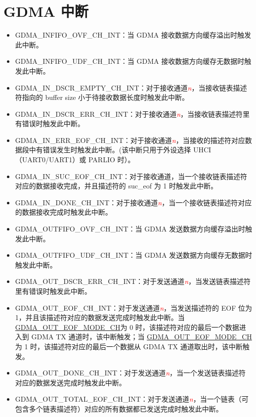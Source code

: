 \documentclass[main\_\_CN.tex]{subfiles}
\begin{document}
\section{GDMA 中断}
\begin{itemize}
\item \label{int:GDMAINFIFOOVFINT} GDMA\_INFIFO\_OVF\_CH\_INT：当 GDMA 接收数据方向缓存溢出时触发此中断。
\item \label{int:GDMAINFIFOUDFINT}GDMA\_INFIFO\_UDF\_CH\_INT：当 GDMA 接收数据方向缓存无数据时触发此中断。
\item \label{int:GDMAINDSCREMPTYINT}GDMA\_IN\_DSCR\_EMPTY\_CH\_INT：对于接收通道\textcolor{red}{\it{n}}，当接收链表描述符指向的 buffer size 小于待接收数据长度时触发此中断。
\item \label{int:GDMAINDSCRERRINT}GDMA\_IN\_DSCR\_ERR\_CH\_INT：对于接收通道\textcolor{red}{\it{n}}，当接收链表描述符里有错误时触发此中断。
\item \label{int:GDMAINERREOFINT}GDMA\_IN\_ERR\_EOF\_CH\_INT：对于接收通道\textcolor{red}{\it{n}}，当接收的描述符对应数据段中有错误发生时触发此中断。(该中断只用于外设选择 UHCI（UART0/UART1）或 PARLIO 时）。
\item \label{int:GDMAINSUCEOFINT}GDMA\_IN\_SUC\_EOF\_CH\_INT：对于接收通道，当一个接收链表描述符对应的数据接收完成，并且描述符的 suc\_eof 为 1 时触发此中断。
\item \label{int:GDMAINDONEINT}GDMA\_IN\_DONE\_CH\_INT：对于接收通道\textcolor{red}{\it{n}}，当一个接收链表描述符对应的数据接收完成时触发此中断。
\item \label{int:GDMAOUTFIFOOVFINT} GDMA\_OUTFIFO\_OVF\_CH\_INT：当 GDMA 发送数据方向缓存溢出时触发此中断。
\item \label{int:GDMAOUTFIFOUDFINT}GDMA\_OUTFIFO\_UDF\_CH\_INT：当 GDMA 发送数据方向缓存无数据时触发此中断。
\item \label{int:GDMAOUTDSCRERRINT}GDMA\_OUT\_DSCR\_ERR\_CH\_INT：对于发送通道\textcolor{red}{\it{n}}，当发送链表描述符里有错误时触发此中断。
\item \label{int:GDMAOUTEOFINT}GDMA\_OUT\_EOF\_CH\_INT：对于发送通道\textcolor{red}{\it{n}}，当发送描述符的 EOF 位为 1，并且该描述符对应的数据发送完成时触发此中断。当 \hyperref[fielddesc:GDMAOUTEOFMODECHN]{GDMA\_OUT\_EOF\_MODE\_CH}为 0 时，该描述符对应的最后一个数据进入到 GDMA TX 通道时，该中断触发；当 \hyperref[fielddesc:GDMAOUTEOFMODECHN]{GDMA\_OUT\_EOF\_MODE\_CH}为 1 时，该描述符对应的最后一个数据从 GDMA TX 通道取出时，该中断触发。
\item \label{int:GDMAOUTDONEINT}GDMA\_OUT\_DONE\_CH\_INT：对于发送通道\textcolor{red}{\it{n}}，当一个发送链表描述符对应的数据发送完成时触发此中断。
\item \label{int:GDMAOUTTOTALEOFINT}GDMA\_OUT\_TOTAL\_EOF\_CH\_INT：对于发送通道\textcolor{red}{\it{n}}，当一个链表（可包含多个链表描述符）对应的所有数据都已发送完成时触发此中断。
\end{itemize}
\end{document}
